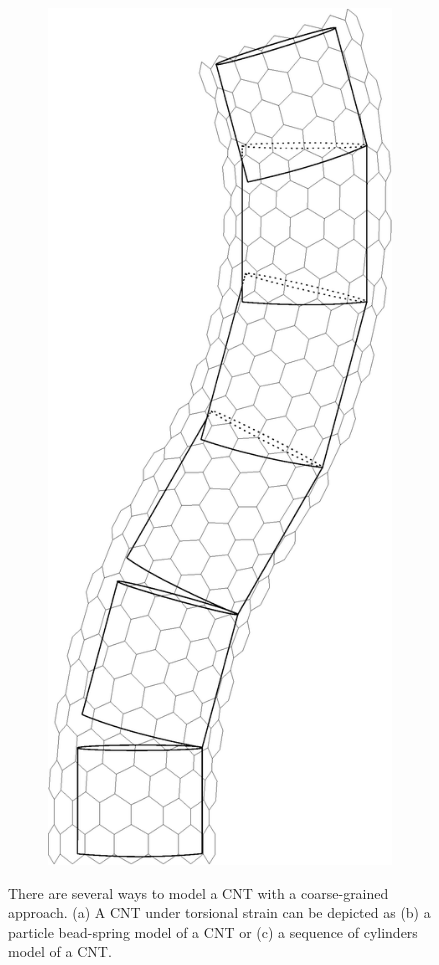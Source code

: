 \begin{figure}[t!]
\begin{subfigure}[t]{.33\textwidth}
			\centering
			\includegraphics[scale=.25]{./old_fig/Nanotube_Coarse_Cylinder.eps}
			\caption{\label{subfig:NanotubeCylinder}}
		\end{subfigure}
		\caption{There are several ways to model a CNT with a coarse-grained approach. (a) A CNT under torsional strain can be depicted as (b) a particle bead-spring model of a CNT or (c) a sequence of cylinders model of a CNT. \label{fig:CoarseGrain}}	
	\end{figure}

